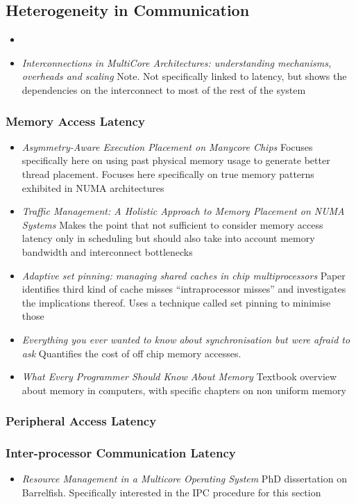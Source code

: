 \subsection{Heterogeneity in Communication}

\begin{itemize}
\item \item \emph{Interconnections in MultiCore Architectures: understanding mechanisms,
overheads and scaling} Note. Not specifically linked to latency, but 
shows the dependencies on the interconnect to most of the rest of the system 
\end{itemize}

\subsubsection{Memory Access Latency}
\begin{itemize}
\item \emph{Asymmetry-Aware Execution Placement on Manycore Chips} Focuses
specifically here on using past physical memory usage to generate better thread
placement. Focuses here specifically on true memory patterns exhibited in 
NUMA architectures
\item \emph{Traffic Management: A Holistic Approach to Memory Placement on NUMA Systems}
Makes the point that not sufficient to consider memory access latency only in scheduling
but should also take into account memory bandwidth and interconnect bottlenecks
\item \emph{Adaptive set pinning: managing shared caches in chip multiprocessors}
Paper identifies third kind of cache misses ``intraprocessor misses'' and
investigates the implications thereof. Uses a technique called
set pinning to minimise those
\item \emph{Everything you ever wanted to know about synchronisation but
were afraid to ask} Quantifies the cost of off chip memory accesses.
\item \emph{What Every Programmer Should Know About Memory} Textbook overview
about memory in computers, with specific chapters on non uniform memory
\end{itemize}
\subsubsection{Peripheral Access Latency}

\subsubsection{Inter-processor Communication Latency}
\begin{itemize}
\item \emph{Resource Management in a Multicore Operating System} PhD dissertation
on Barrelfish. Specifically interested in the IPC procedure for this section

\end{itemize}
